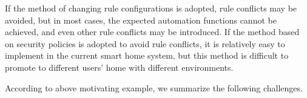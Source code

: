 If the method of changing rule configurations is adopted, rule conflicts may be avoided, but in most cases, the expected automation functions cannot be achieved, and even other rule conflicts may be introduced. If the method based on security policies is adopted to avoid rule conflicts, it is relatively easy to implement in the current smart home system, but this method is difficult to promote to different users' home with different environments.

According to above motivating example, we summarize the following challenges.





